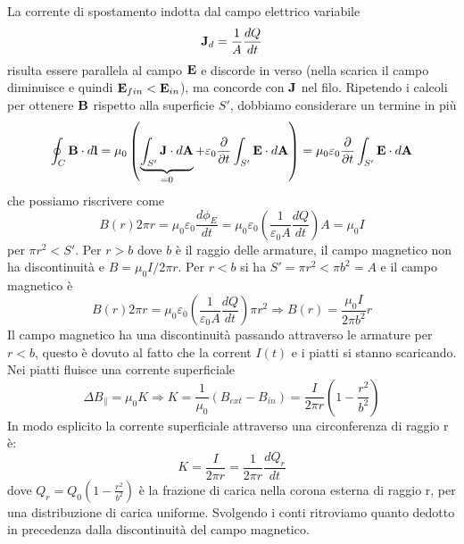  La corrente di spostamento indotta dal campo elettrico variabile 
 \begin{equation*}
 	\bold{J}_d = \frac{1}{A} \frac{dQ}{dt}
 \end{equation*}
 risulta essere parallela al campo $\bold{E}$ e discorde in verso (nella scarica il campo diminuisce e quindi $\bold{E}_{fin} < \bold{E}_{in}$), ma concorde con $\bold{J}$ nel filo. Ripetendo i calcoli per ottenere $\bold{B}$ rispetto alla superficie $S'$, dobbiamo considerare un termine in pi\`u 
 \begin{equation*}
 	\oint_{C} \bold{B} \cdot d\bold{l} = \mu_0 \left( \underbrace{\int_{S'} \bold{J} \cdot d\bold{A}}_{=0} +  \varepsilon_0 \frac{\partial }{\partial t} \int_{S'} \bold{E} \cdot d \bold{A}\right) = \mu_0 \varepsilon_0 \frac{\partial }{\partial t} \int_{S'} \bold{E} \cdot d\bold{A}
 \end{equation*}
 che possiamo riscrivere come 
 \begin{equation*}
 	B(r) 2 \pi r = \mu_0 \varepsilon_0 \frac{d \phi_E}{dt} = \mu_0 \varepsilon_0 \left(\frac{1}{\varepsilon_0 A} \frac{dQ}{dt}\right)A = \mu_0 I
 \end{equation*}
 per $\pi r^2 < S'$. Per $r>b$ dove $b$ \`e il raggio delle armature, il campo magnetico non ha discontinuit\`a e $B = \mu_0 I / 2\pi r$. Per $r<b$ si ha $S' = \pi r^2 < \pi b^2 = A$ e il campo  magnetico \`e 
 \begin{equation*}
 	B(r) 2\pi r  = \mu_0 \varepsilon_0 \left(\frac{1}{\varepsilon_0 A}\frac{dQ}{dt}\right)\pi r^2  \Rightarrow B(r) = \frac{\mu_0 I}{2 \pi b^2}r
 \end{equation*}
Il campo magnetico ha una discontinuit\`a passando attraverso le armature per $r<b$, questo \`e dovuto al fatto che la corrent $I(t)$ e i piatti si stanno scaricando. Nei piatti fluisce una corrente superficiale 
\begin{equation*}
	\Delta B_{\parallel} = \mu_0 K \Rightarrow K = \frac{1}{\mu_0}(B_{ext} - B_{in}) = \frac{I}{2\pi r}\left(1 - \frac{r^2}{b^2}\right)
\end{equation*}
In modo esplicito la corrente superficiale attraverso una circonferenza di raggio r \`e: 
\begin{equation*}
	K = \frac{I}{2 \pi r} = \frac{1}{2\pi r}\frac{dQ_r}{dt}
\end{equation*}
dove $Q_r = Q_0\left(1-\frac{r^2}{b^2}\right)$ \`e la frazione di carica nella corona esterna di raggio r, per una distribuzione di carica uniforme. Svolgendo i conti ritroviamo quanto dedotto in precedenza dalla discontinuit\`a del campo magnetico.

